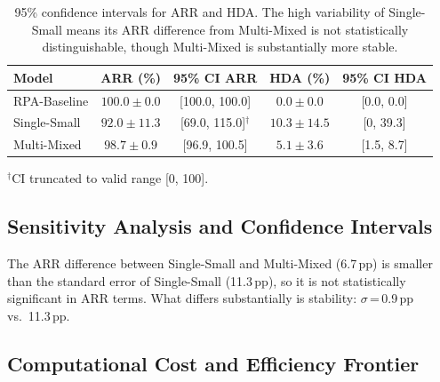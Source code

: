 \documentclass[preprint,12pt,numrefs]{elsarticle}
\begin{document}
\begin{table}[H]
\centering
\caption{95\% confidence intervals for ARR and HDA. The high
         variability of Single-Small means its ARR difference from
         Multi-Mixed is not statistically distinguishable, though
         Multi-Mixed is substantially more stable.}
\label{tab:ic}
\begin{tabular}{lcccc}
\toprule
\textbf{Model} & \textbf{ARR (\%)} & \textbf{95\% CI ARR} &
  \textbf{HDA (\%)} & \textbf{95\% CI HDA} \\
\midrule
RPA-Baseline  & $100.0 \pm 0.0$  & [100.0, 100.0]  & $0.0 \pm 0.0$   & [0.0, 0.0] \\
Single-Small  & $92.0 \pm 11.3$  & [69.0, 115.0]$^\dagger$ & $10.3 \pm 14.5$ & [0, 39.3] \\
Multi-Mixed   & $98.7 \pm 0.9$   & [96.9, 100.5]   & $5.1 \pm 3.6$   & [1.5, 8.7] \\
\bottomrule
\end{tabular}
\par\smallskip
\footnotesize $^\dagger$CI truncated to valid range [0, 100].
\end{table}


\subsection{Sensitivity Analysis and Confidence Intervals}

The ARR difference between Single-Small and Multi-Mixed (6.7\,pp) is
smaller than the standard error of Single-Small (11.3\,pp), so it is
not statistically significant in ARR terms. What differs substantially
is stability: $\sigma$\,=\,0.9\,pp vs.\ 11.3\,pp.

\subsection{Computational Cost and Efficiency Frontier}
\end{document}

